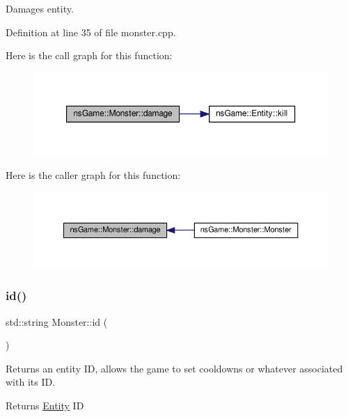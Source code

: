 Damages entity. 



Definition at line 35 of file monster.\+cpp.

Here is the call graph for this function\+:\nopagebreak
\begin{figure}[H]
\begin{center}
\leavevmode
\includegraphics[width=350pt]{classns_game_1_1_monster_a48644849ca73888a148d6afb7eb0fa17_cgraph}
\end{center}
\end{figure}
Here is the caller graph for this function\+:\nopagebreak
\begin{figure}[H]
\begin{center}
\leavevmode
\includegraphics[width=350pt]{classns_game_1_1_monster_a48644849ca73888a148d6afb7eb0fa17_icgraph}
\end{center}
\end{figure}
\mbox{\label{classns_game_1_1_monster_a14a0c542fe9c8b6772a3984ed674c9cf}} 
\subsubsection{\texorpdfstring{id()}{id()}}
{\footnotesize\ttfamily std\+::string Monster\+::id (\begin{DoxyParamCaption}{ }\end{DoxyParamCaption})}



Returns an entity ID, allows the game to set cooldowns or whatever associated with its ID. 

\begin{DoxyReturn}{Returns}
\hyperlink{structns_game_1_1_entity}{Entity} ID 
\end{DoxyReturn}


